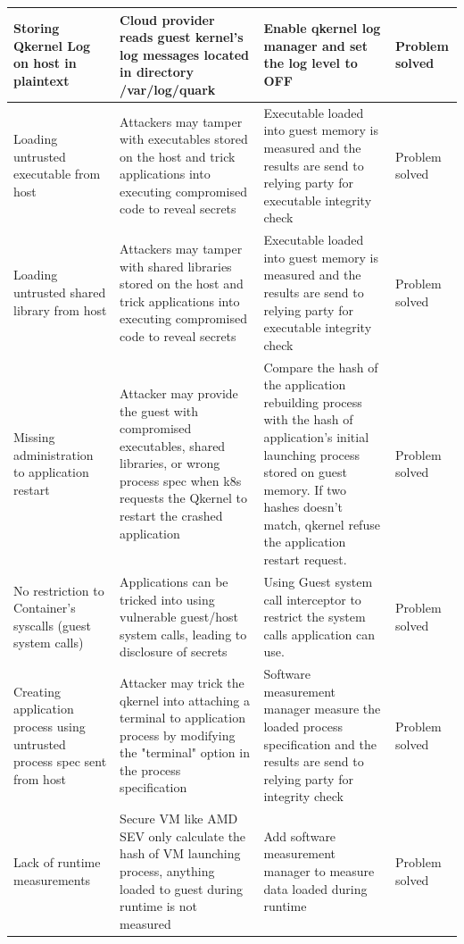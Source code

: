 \begin{table}[H]
\begin{tabular}{  p{3.4cm}  p{3.4cm}  p{3.4cm} p{2cm} }
Storing Qkernel Log on host in plaintext
& Cloud provider reads guest kernel’s log messages located in directory /var/log/quark
& Enable qkernel log manager and set the log level to OFF
& Problem solved  \\\hline

Loading untrusted executable from host
& Attackers may tamper with executables stored on the host and trick applications into executing compromised code to reveal secrets
& Executable loaded into guest memory is measured and the results are send to relying party for executable integrity check
& Problem solved  \\\hline

Loading untrusted shared library from host
& Attackers may tamper with shared libraries stored on the host and trick applications into executing compromised code to reveal secrets
& Executable loaded into guest memory is measured and the results are send to relying party for executable integrity check
& Problem solved  \\\hline

Missing administration to application restart
& Attacker may provide the guest with compromised executables, shared libraries, or wrong process spec when k8s requests the Qkernel to restart the crashed application
& Compare the hash of the application rebuilding process with the hash of application's initial launching process stored on guest memory. If two hashes doesn’t match,  qkernel refuse the application restart request.
& Problem solved  \\\hline


No restriction to Container's syscalls (guest system calls)
& Applications can be tricked into using vulnerable guest/host system calls, leading to disclosure of secrets
& Using Guest system call interceptor to restrict the system calls application can use.
& Problem solved  \\\hline


Creating application process using untrusted process spec sent from host
& Attacker may trick the qkernel into attaching a terminal to application process by modifying the "terminal" option in the process specification
& Software measurement manager measure the loaded process specification and the results are send to relying party for integrity check
& Problem solved  \\\hline


Lack of runtime measurements
& Secure VM like AMD SEV only calculate the hash of VM launching process, anything loaded to guest during runtime is not measured
& Add software measurement manager to measure data loaded during runtime
& Problem solved  \\\hline
        \bottomrule
    \end{tabular}
\end{table}


